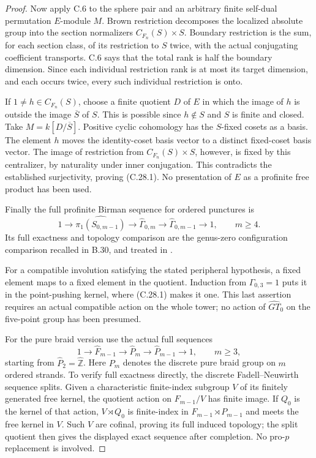 \begin{proof}
Now apply C.6 to the sphere pair and an arbitrary finite
self-dual permutation $E$-module $M$.  Brown restriction
decomposes the localized absolute group into the section
normalizers $C_{F_n}(S)\times S$.  Boundary restriction
is the sum, for each section class, of its restriction
to $S$ twice, with the actual conjugating coefficient
transports.  C.6 says that the total rank is half the
boundary dimension.  Since each individual restriction
rank is at most its target dimension, and each occurs
twice, every such individual restriction is onto.

If $1\ne h\in C_{F_n}(S)$, choose a finite quotient
$D$ of $E$ in which the image of $h$ is outside the
image $\overline S$ of $S$.  This is possible since
$h\notin S$ and $S$ is finite and closed.  Take
$M=k[D/\overline S]$.  Positive cyclic cohomology
has the $S$-fixed cosets as a basis.  The element $h$
moves the identity-coset basis vector to a distinct
fixed-coset basis vector.  The image of restriction
from $C_{F_n}(S)\times S$, however, is fixed by this
centralizer, by naturality under inner conjugation.
This contradicts the established surjectivity, proving
(C.28.1).  No presentation of $E$ as a profinite
free product has been used.

Finally the full profinite Birman sequence for ordered
punctures is
\[
 1\longrightarrow\widehat{\pi_1(S_{0,m-1})}
 \longrightarrow\widehat\Gamma_{0,m}
 \longrightarrow\widehat\Gamma_{0,m-1}
 \longrightarrow1,\qquad m\geq4 .
\]
Its full exactness and topology comparison are the
genus-zero configuration comparison recalled in B.30,
and treated in \cite{CEBoggiCongruence2020}.

For a compatible involution satisfying the stated
peripheral hypothesis, a fixed element maps to a
fixed element in the quotient.  Induction from
$\Gamma_{0,3}=1$ puts it in the point-pushing kernel,
where (C.28.1) makes it one.  This last assertion
requires an actual compatible action on the whole
tower; no action of $\widehat{GT}_0$ on the
five-point group has been presumed.

For the pure braid version use the actual full sequences
\[
 1\longrightarrow\widehat F_{m-1}
 \longrightarrow\widehat P_m
 \longrightarrow\widehat P_{m-1}
 \longrightarrow1,\qquad m\geq3,
\]
starting from $\widehat P_2=\widehat{\mathbb Z}$.
Here $P_m$ denotes the discrete pure braid group on
$m$ ordered strands.  To verify full exactness directly,
the discrete Fadell--Neuwirth sequence splits.  Given a
characteristic finite-index subgroup $V$ of its finitely
generated free kernel, the quotient action on $F_{m-1}/V$
has finite image.  If $Q_0$ is the kernel of that action,
$V\rtimes Q_0$ is finite-index in
$F_{m-1}\rtimes P_{m-1}$ and meets the free kernel in $V$.
Such $V$ are cofinal, proving its full induced topology;
the split quotient then gives the displayed exact sequence
after completion.  No pro-$p$ replacement is involved.


\end{proof}
